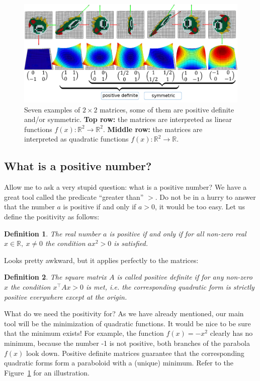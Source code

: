 \documentclass[notitlepage]{report}
\newtheorem{definition}{Definition}
\begin{document}
\begin{figure}[ht]
	\centering
	\includegraphics[width=\linewidth]{matrices}
	\caption{Seven examples of $2\times 2$ matrices, some of them are positive definite and/or symmetric. 
    \textbf{Top row:} the matrices are interpreted as linear functions $f(x):\mathbb R^2 \rightarrow \mathbb R^2$. \textbf{Middle row:} the matrices are interpreted as quadratic functions
 $f(x):\mathbb R^2 \rightarrow \mathbb R$.}
	\label{fig:matrices}
\end{figure}


\subsection{What is a positive number?}
Allow me to ask a very stupid question: what is a positive number?
We have a great tool called the predicate ``greater than'' $>$.
Do not be in a hurry to answer that the number $a$ is positive if and only if $a>0$, it would be too easy. Let us define the positivity as follows:

\begin{definition}
The real number $a$ is positive if and only if for all non-zero real $x\in\mathbb R,\ x\neq 0$ the condition $ax^2>0$ is satisfied.
\end{definition}

Looks pretty awkward, but it applies perfectly to the matrices:

\begin{definition}
The square matrix $A$ is called positive definite if for any non-zero $x$
the condition $x^\top A x > 0$ is met, i.e. the corresponding quadratic form is strictly positive everywhere except at the origin.
\end{definition}

What do we need the positivity for?
As we have already mentioned, our main tool will be the minimization of quadratic functions. 
It would be nice to be sure that the minimum exists!
For example, the function $f(x) = - x^2$ clearly has no minimum, because the number -1 is not positive, 
both branches of the parabola $f(x)$ look down.
Positive definite matrices guarantee that the corresponding quadratic forms form a paraboloid with a (unique) minimum.
Refer to the Figure~\ref{fig:matrices} for an illustration.
\end{document}
